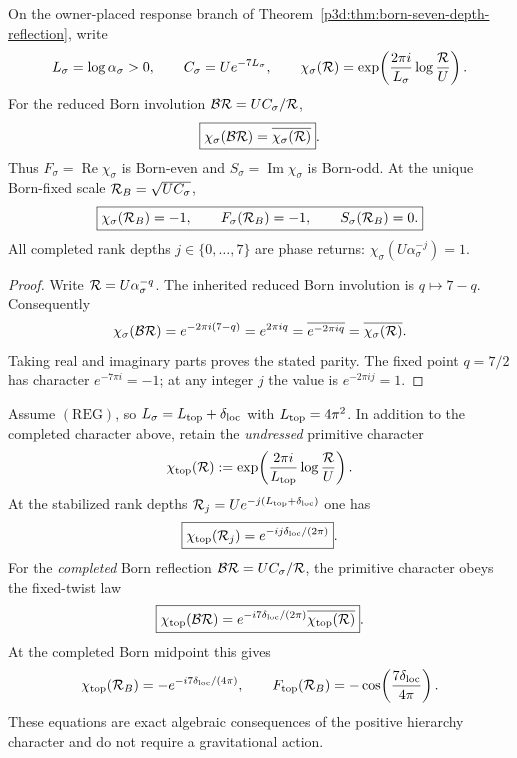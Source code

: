 \documentclass[12pt,a4paper]{article}
\begin{document}
\begin{theorem}
\label{p3d:thm:v222-born-phase-conjugation}
On the owner-placed response branch of
Theorem~\ref{p3d:thm:born-seven-depth-reflection}, write
\[
 L_\sigma=\log\alpha_\sigma>0,\qquad
 C_\sigma=Ue^{-7L_\sigma},\qquad
 \chi_\sigma(\mathcal R)
 =\exp\!\left(\frac{2\pi i}{L_\sigma}\log\frac{\mathcal R}{U}\right).
\]
For the reduced Born involution $\mathcal B\mathcal R=UC_\sigma/\mathcal R$,
\begin{equation}
\label{p3d:eq:v222-born-conjugation}
 \boxed{\chi_\sigma(\mathcal B\mathcal R)
       =\overline{\chi_\sigma(\mathcal R)}}.
\end{equation}
Thus $F_\sigma=\operatorname{Re}\chi_\sigma$ is Born-even and
$S_\sigma=\operatorname{Im}\chi_\sigma$ is Born-odd.
At the unique Born-fixed scale $\mathcal R_B=\sqrt{UC_\sigma}$,
\[
 \boxed{\chi_\sigma(\mathcal R_B)=-1,\qquad
        F_\sigma(\mathcal R_B)=-1,\qquad S_\sigma(\mathcal R_B)=0.}
\]
All completed rank depths $j\in\{0,\ldots,7\}$ are phase returns:
$\chi_\sigma(U\alpha_\sigma^{-j})=1$.
\end{theorem}

\begin{proof}
Write $\mathcal R=U\alpha_\sigma^{-q}$.
The inherited reduced Born involution is $q\mapsto7-q$.
Consequently
\[
 \chi_\sigma(\mathcal B\mathcal R)
 =e^{-2\pi i(7-q)}=e^{2\pi iq}
 =\overline{e^{-2\pi iq}}
 =\overline{\chi_\sigma(\mathcal R)}.
\]
Taking real and imaginary parts proves the stated parity.  The fixed
point $q=7/2$ has character $e^{-7\pi i}=-1$; at any integer $j$ the
value is $e^{-2\pi i j}=1$.
\end{proof}

\begin{theorem}
\label{p3d:thm:v222-primitive-phase-twist}
Assume $(\mathrm{REG})$, so $L_\sigma=L_{\rm top}+\delta_{\rm loc}$
with $L_{\rm top}=4\pi^2$.  In addition to the completed character
above, retain the \emph{undressed} primitive character
\[
 \chi_{\rm top}(\mathcal R)
   :=\exp\!\left(\frac{2\pi i}{L_{\rm top}}
                         \log\frac{\mathcal R}{U}\right).
\]
At the stabilized rank depths
$\mathcal R_j=Ue^{-j(L_{\rm top}+\delta_{\rm loc})}$ one has
\begin{equation}
\label{p3d:eq:v222-primitive-phase-drift}
 \boxed{\chi_{\rm top}(\mathcal R_j)
       =e^{-i j\delta_{\rm loc}/(2\pi)}}.
\end{equation}
For the \emph{completed} Born reflection
$\mathcal B\mathcal R=UC_\sigma/\mathcal R$, the primitive character obeys the
fixed-twist law
\begin{equation}
\label{p3d:eq:v222-primitive-born-twist}
 \boxed{\chi_{\rm top}(\mathcal B\mathcal R)
    =e^{-i7\delta_{\rm loc}/(2\pi)}
                         \overline{\chi_{\rm top}(\mathcal R)}}.
\end{equation}
At the completed Born midpoint this gives
\[
 \chi_{\rm top}(\mathcal R_B)
    =-e^{-i7\delta_{\rm loc}/(4\pi)},\qquad
 F_{\rm top}(\mathcal R_B)
    =-\cos\!\left(\frac{7\delta_{\rm loc}}{4\pi}\right).
\]
These equations are exact algebraic consequences of the positive
hierarchy character and do not require a gravitational action.
\end{theorem}
\end{document}
